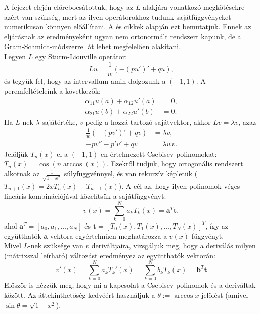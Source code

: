 \documentclass[oneside, titlepage, 12pt, a4paper]{report}
\begin{document}
A fejezet elején előrebocsátottuk, hogy az $L$ alakjára vonatkozó megkötésekre azért van szükség, mert az ilyen operátorokhoz tudunk sajátfüggvényeket numerikusan könnyen előállítani. A  \cite{ChebysevTau} és \cite{LISC} cikkek alapján ezt bemutatjuk. Ennek az eljárásnak az eredményeként ugyan nem ortonormált rendszert kapunk, de a Gram-Schmidt-módszerrel át lehet megfelelően alakítani. \\
Legyen $L$ egy Sturm-Liouville operátor:
\begin{equation*}
L u = \frac{1}{w} ( -(p u')' + q u),
\end{equation*}
és tegyük fel, hogy az intervallum amin dolgozunk a $(-1, 1)$. A peremfeltételeink a következők:
\begin{align*}
\alpha_{11}u(a) + \alpha_{12}u'(a) &= 0, \\
\alpha_{21}u(b) + \alpha_{22}u'(b) &= 0.
\end{align*}
Ha $L$-nek $\lambda$ sajátértéke, $v$ pedig a hozzá tartozó sajátvektor, akkor $L v = \lambda v$, azaz
\begin{align}
\frac{1}{w} ( -(p v')' + q v) &= \lambda v, \nonumber \\
-p v'' - p' v' + q v &= \lambda w v. \label{eq:CT:2}
\end{align}
Jelöljük $T_n(x)$-el a $(-1, 1)$-en értelmezett Csebisev-polinomokat: $T_n(x) = \cos(n \arccos(x))$. Ezekről tudjuk, hogy ortogonális rendszert alkotnak az $\frac{1}{\sqrt{1 - x^2}}$ súlyfüggvénnyel, és van rekurzív képletük ($T_{n+1}(x) = 2xT_n(x) - T_{n-1}(x)$). A cél az, hogy ilyen polinomok véges lineáris kombinációjával közelítsük a sajátfüggvényt:
\begin{equation*}
v(x) = \sum_{k = 0}^N a_k T_k(x) = \mathbf{a}^T \mathbf{t},
\end{equation*}
ahol $\mathbf{a}^T = [a_0, a_1, \dots, a_N]$ és $\mathbf{t} = [T_0(x), T_1(x), \dots, T_N(x)]^T$, így az együtthatók $\mathbf{a}$ vektora egyértelműen meghatározza a $v(x)$ függvényt. \\
Mivel $L$-nek szüksége van $v$ deriváltjaira, vizsgáljuk meg, hogy a deriválás milyen (mátrixszal leírható) változást eredményez az együtthatók vektorán:
\begin{equation}
v'(x) = \sum_{k = 0}^N a_k T_k'(x) = \sum_{k = 0}^N b_k T_k(x) = \mathbf{b}^T \mathbf{t} \label{eq:CT:1}
\end{equation}
Először is nézzük meg, hogy mi a kapcsolat a Csebisev-polinomok és a deriváltak között. Az áttekinthetőség kedvéért használjuk a $\theta := \arccos x$ jelölést (amivel $\sin \theta = \sqrt{1 - x^2}$).
\end{document}
